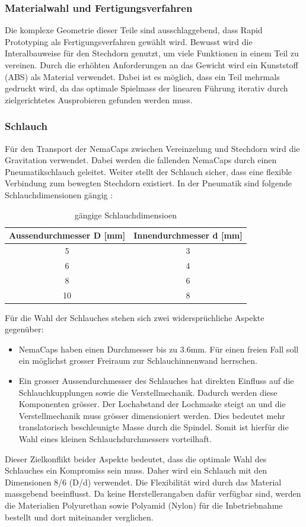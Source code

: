 \subsubsection{Materialwahl und Fertigungsverfahren}
Die komplexe Geometrie dieser Teile sind ausschlaggebend, dass Rapid Prototyping als Fertigungsverfahren gewählt wird. Bewusst wird die Interalbauweise für den Stechdorn genutzt, um viele Funktionen in einem Teil zu vereinen. Durch die erhöhten Anforderungen an das Gewicht wird ein Kunststoff (ABS) als Material verwendet. Dabei ist es möglich, dass ein Teil mehrmals gedruckt wird, da das optimale Spielmass der linearen Führung iterativ durch zielgerichtetes Ausprobieren gefunden werden muss. 

\subsubsection{Schlauch}
Für den Transport der NemaCaps zwischen Vereinzelung und Stechdorn wird die Gravitation verwendet. Dabei werden die fallenden NemaCaps durch einen Pneumatikschlauch geleitet. Weiter stellt der Schlauch sicher, dass eine flexible Verbindung zum bewegten Stechdorn existiert. In der Pneumatik sind folgende Schlauchdimensionen gängig \cite{camozzi}:
\newline
\begin{table}[H]
\begin{tabular}{|c|c|}
	\hline 
	Aussendurchmesser D [mm] & Innendurchmesser d [mm] \\ 
	\hline 
	5 & 3 \\ 
	\hline 
	6 & 4  \\ 
	\hline 
	8 & 6 \\ 
	\hline 
	10 & 8  \\ 
	\hline 
\end{tabular}
	\caption{gängige Schlauchdimensioen}
	\label{tab:Schlauchdimensioen}
\end{table}

Für die Wahl der Schlauches stehen sich zwei widersprüchliche Aspekte gegenüber:
\begin{itemize}
	\item NemaCaps haben einen Durchmesser bis zu 3.6mm. Für einen freien Fall soll ein möglichst grosser Freiraum zur Schlauchinnenwand herrschen.
	
	\item Ein grosser Aussendurchmesser des Schlauches hat direkten Einfluss auf die Schlauchkupplungen sowie die Verstellmechanik. Dadurch werden diese Komponenten grösser. Der Lochabstand der Lochmaske steigt an und die Verstellmechanik muss grösser dimensioniert werden. Dies bedeutet mehr translatorisch beschleunigte Masse durch die Spindel. Somit ist hierfür die Wahl eines kleinen Schlauchdurchmessers vorteilhaft.
\end{itemize}
Dieser Zielkonflikt beider Aspekte bedeutet, dass die optimale Wahl des Schlauches ein Kompromiss sein muss. Daher wird ein Schlauch mit den Dimensionen 8/6 (D/d) verwendet.
\newline
Die Flexibilität wird durch das Material massgebend beeinflusst. Da keine Herstellerangaben dafür verfügbar sind, werden die Materialien Polyurethan sowie Polyamid (Nylon) für die Inbetriebnahme bestellt und dort miteinander verglichen.
